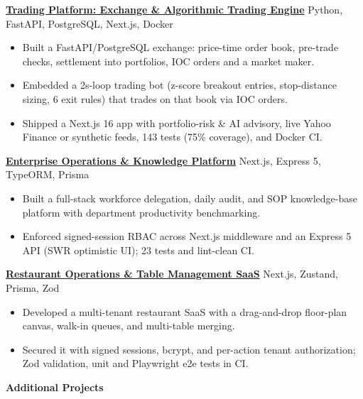 \documentclass[a4paper]{article}
\newcommand{\entry}[2]{%
    {\fontsize{9.2}{11.5}\textbf{#1}} \hfill {\fontsize{8.4}{10.6}\selectfont #2} \par
}
\newcommand{\desc}[1]{%
    {\fontsize{8.0}{10.3}\selectfont #1}%
}
\begin{document}
\entry{\href{https://github.com/yigitsarpavci/trading-platform}{Trading Platform: Exchange \& Algorithmic Trading Engine}}{Python, FastAPI, PostgreSQL, Next.js, Docker}
\begin{itemize}[leftmargin=1.1em, itemsep=1.2pt, parsep=0pt, topsep=1.2pt]
   \item \desc{Built a FastAPI/PostgreSQL exchange: price-time order book, pre-trade checks, settlement into portfolios, IOC orders and a market maker.}
   \item \desc{Embedded a 2s-loop trading bot (z-score breakout entries, stop-distance sizing, 6 exit rules) that trades on that book via IOC orders.}
   \item \desc{Shipped a Next.js 16 app with portfolio-risk \& AI advisory, live Yahoo Finance or synthetic feeds, 143 tests (75\% coverage), and Docker CI.}
\end{itemize}
\vspace{5.0pt}

\entry{\href{https://github.com/yigitsarpavci/enterprise-admin-dashboard}{Enterprise Operations \& Knowledge Platform}}{Next.js, Express 5, TypeORM, Prisma}
\begin{itemize}[leftmargin=1.1em, itemsep=1.2pt, parsep=0pt, topsep=1.2pt]
   \item \desc{Built a full-stack workforce delegation, daily audit, and SOP knowledge-base platform with department productivity benchmarking.}
   \item \desc{Enforced signed-session RBAC across Next.js middleware and an Express 5 API (SWR optimistic UI); 23 tests and lint-clean CI.}
\end{itemize}
\vspace{5.0pt}


\entry{\href{https://github.com/yigitsarpavci/restaurant-floor-plan-saas}{Restaurant Operations \& Table Management SaaS}}{Next.js, Zustand, Prisma, Zod}
\begin{itemize}[leftmargin=1.1em, itemsep=1.2pt, parsep=0pt, topsep=1.2pt]
   \item \desc{Developed a multi-tenant restaurant SaaS with a drag-and-drop floor-plan canvas, walk-in queues, and multi-table merging.}
   \item \desc{Secured it with signed sessions, bcrypt, and per-action tenant authorization; Zod validation, unit and Playwright e2e tests in CI.}
\end{itemize}
\vspace{5.0pt}


\entry{Additional Projects}{}
\end{document}
